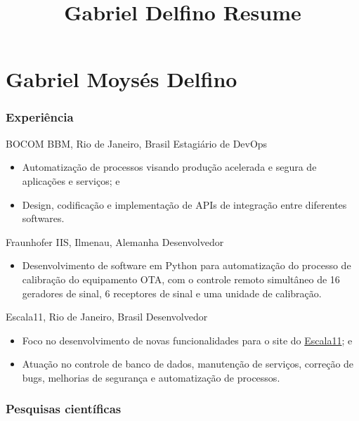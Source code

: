 \documentclass{tccv}
\title{Gabriel Delfino Resume}
\begin{document}
\part{Gabriel Moysés Delfino}


\section{Experiência}

    \begin{eventlist}

            {BOCOM BBM, Rio de Janeiro, Brasil}
            {Estagiário de DevOps}
            \begin{itemize}
                \item Automatização de processos visando produção acelerada e segura de aplicações e serviços; e
                \item Design, codificação e implementação de APIs de integração entre diferentes softwares.
            \end{itemize}

            {Fraunhofer IIS, Ilmenau, Alemanha}
            {Desenvolvedor}
            \begin{itemize}
                \item Desenvolvimento de software em Python para automatização do processo de calibração do equipamento OTA, com o controle remoto simultâneo de 16 geradores de sinal, 6 receptores de sinal e uma unidade de calibração.
            \end{itemize}
        
            {Escala11, Rio de Janeiro, Brasil}
            {Desenvolvedor}
            \begin{itemize}
                \item Foco no desenvolvimento de novas funcionalidades para o site do \href{https://www.escala11.com/}{Escala11}; e
                \item Atuação no controle de banco de dados, manutenção de serviços, correção de bugs, melhorias de segurança e automatização de processos.
            \end{itemize}
    \end{eventlist}

\section{Pesquisas científicas}
\end{document}
